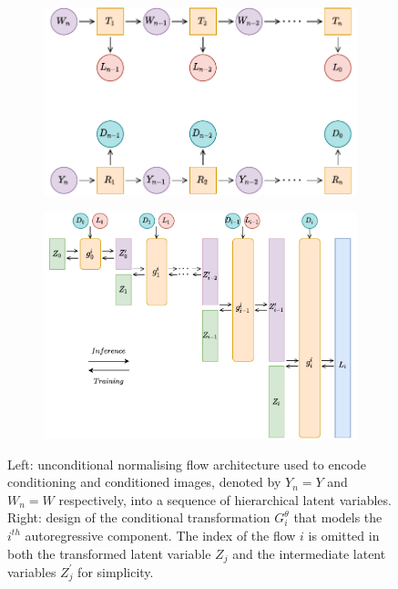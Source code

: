 \begin{figure}[t]
    \centering
    \begin{subfigure}{0.45\textwidth}
        \includegraphics[width=\textwidth]{Chapter1/figures/dual_glow.pdf}
    \end{subfigure}%
    \qquad 
    \begin{subfigure}{0.47\textwidth}
            \includegraphics[width=\textwidth]{Chapter1/figures/high_level_design_conditional_modified.pdf}
    \end{subfigure}
    \caption{Left: unconditional normalising flow architecture used to encode conditioning and conditioned images, denoted by $Y_n = Y$ and $W_n = W$ respectively, into a sequence of hierarchical latent variables. Right: design of the conditional transformation $G_{i}^\theta$ that models the $i^{th}$ autoregressive component. The index of the flow $i$ is omitted in both the transformed latent variable $Z_j$ and the intermediate latent variables $Z_j^{\prime}$ for simplicity.}
           \label{ch1:fig:high_level_design_conditional}
\end{figure}

